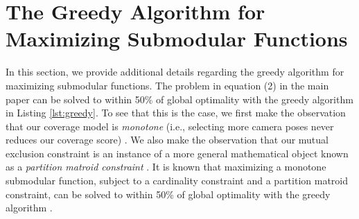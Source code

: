 \begin{Listing}[t]
\begin{algorithmic}[1]
\ENDFOR





    \ENDWHILE



    
    \ENDFOR

\ENDFOR


\end{algorithmic}
\end{Listing}

\vspace{-0pt}
\section{The Greedy Algorithm for Maximizing Submodular Functions}
\label{sec:greedy}

In this section, we provide additional details regarding the greedy algorithm for maximizing submodular functions.
The problem in equation (2) in the main paper can be solved to within 50\% of global optimality with the greedy algorithm in Listing \ref{lst:greedy}.
To see that this is the case, we first make the observation that our coverage model is \emph{monotone} (i.e., selecting more camera poses never reduces our coverage score) \cite{krause:2014}.
We also make the observation that our mutual exclusion constraint is an instance of a more general mathematical object known as a \emph{partition matroid constraint} \cite{krause:2014}.
It is known that maximizing a monotone submodular function, subject to a cardinality constraint and a partition matroid constraint, can be solved to within 50\% of global optimality with the greedy algorithm \cite{krause:2014}.

